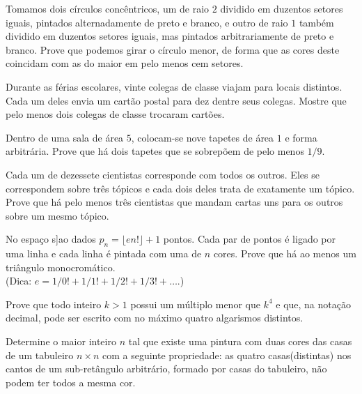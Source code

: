 \begin{questao}
  Tomamos dois círculos concêntricos, um de raio $2$
  dividido em duzentos setores iguais, pintados alternadamente de
  preto e branco, e outro de raio $1$ também dividido em duzentos
  setores iguais, mas pintados arbitrariamente de preto e
  branco. Prove que podemos girar o círculo menor, de forma que as
  cores deste coincidam com as do maior em pelo menos cem setores.
\end{questao}

\begin{questao}
  Durante as férias escolares, vinte colegas de classe
  viajam para locais distintos. Cada um deles envia um cartão postal
  para dez dentre seus colegas. Mostre que pelo menos dois colegas de
  classe trocaram cartões.
\end{questao}

\begin{questao}
  Dentro de uma sala de área $5$, colocam-se nove tapetes
  de área $1$ e forma arbitrária. Prove que há dois tapetes que se
  sobrepõem de pelo menos $1/9$.
\end{questao}

\begin{questao}
  Cada um de dezessete cientistas corresponde com todos os
  outros. Eles se correspondem sobre três tópicos e cada dois deles
  trata de exatamente um tópico. Prove que há pelo menos três
  cientistas que mandam cartas uns para os outros sobre um mesmo
  tópico.
\end{questao}

\begin{questao}
  No espaço s]ao dados $p_n=\lfloor en! \rfloor + 1$
  pontos. Cada par de pontos é ligado por uma linha e cada linha é
  pintada com uma de $n$ cores. Prove que há ao menos um triângulo
  monocromático.\\
  (Dica: $e=1/0!+1/1!+1/2!+1/3!+\ldots$.)
\end{questao}

\begin{questao}
  Prove que todo inteiro $k>1$ possui um múltiplo menor
  que $k^4$ e que, na notação decimal, pode ser escrito com no
  máximo quatro algarismos distintos.
\end{questao}

\begin{questao}
  Determine o maior inteiro $n$ tal que existe uma pintura
  com duas cores das casas de um tabuleiro $n \times n$ com a
  seguinte propriedade: as quatro casas(distintas) nos cantos de um
  sub-retângulo arbitrário, formado por casas do tabuleiro, não podem
  ter todos a mesma cor.
\end{questao}

